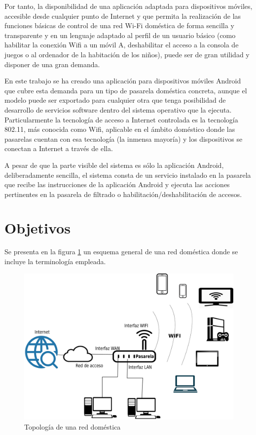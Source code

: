 \documentclass[12pt, twoside]{article}
\begin{document}
Por tanto, la disponibilidad de una aplicación adaptada para dispositivos móviles, accesible desde cualquier punto de Internet y que permita la realización de las funciones básicas de control de una red Wi-Fi doméstica de forma sencilla y transparente y en un lenguaje adaptado al perfil de un usuario básico (como habilitar la conexión Wifi a un móvil A, deshabilitar el acceso a la consola de juegos o al ordenador de la habitación de los niños), puede ser de gran utilidad y disponer de una gran demanda.

En este trabajo se ha creado una aplicación para dispositivos móviles Android que cubre esta demanda para un tipo de pasarela doméstica concreta, aunque el modelo puede ser exportado para cualquier otra que tenga posibilidad de desarrollo de servicios software dentro del sistema operativo que la ejecuta. Particularmente la tecnología de acceso a Internet controlada es la tecnología 802.11, más conocida como Wifi, aplicable en el ámbito doméstico donde las pasarelas cuentan con esa tecnología (la inmensa mayoría) y los dispositivos se conectan a Internet a través de ella.

A pesar de que la parte visible del sistema es sólo la aplicación Android, deliberadamente sencilla, el sistema consta de un servicio instalado en la pasarela que recibe las instrucciones de la aplicación Android y ejecuta las acciones pertinentes en la pasarela de filtrado o habilitación/deshabilitación de accesos.

\cleardoublepage \section{Objetivos} \label{sec:obj}
    Se presenta en la figura \ref{fig:red_soho} un esquema general de una red doméstica donde se incluye la terminología empleada.

    \begin{figure}[h!]
    \centering
        \includegraphics[scale=0.2]{soho_network.eps}
        \caption{Topología de una red doméstica}
        \label{fig:red_soho}
    \end{figure}
\end{document}
